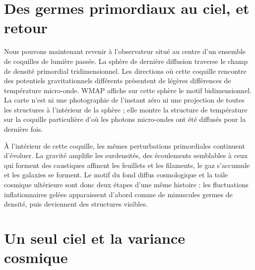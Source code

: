 \section{Des germes primordiaux au ciel, et retour}

Nous pouvons maintenant revenir à l’observateur situé au centre d’un ensemble de coquilles de lumière passée. La sphère de dernière diffusion traverse le champ de densité primordial tridimensionnel. Les directions où cette coquille rencontre des potentiels gravitationnels différents présentent de légères différences de température micro-onde. WMAP affiche sur cette sphère le motif bidimensionnel. La carte n’est ni une photographie de l’instant zéro ni une projection de toutes les structures à l’intérieur de la sphère ; elle montre la structure de température sur la coquille particulière d’où les photons micro-ondes ont été diffusés pour la dernière fois.

À l’intérieur de cette coquille, les mêmes perturbations primordiales continuent d’évoluer. La gravité amplifie les surdensités, des écoulements semblables à ceux qui forment des caustiques affinent les feuillets et les filaments, le gaz s’accumule et les galaxies se forment. Le motif du fond diffus cosmologique et la toile cosmique ultérieure sont donc deux étapes d’une même histoire : les fluctuations inflationnaires gelées apparaissent d’abord comme de minuscules germes de densité, puis deviennent des structures visibles.

\begin{classroomqa}
\end{classroomqa}

\section{Un seul ciel et la variance cosmique}

